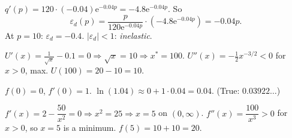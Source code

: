 \begin{solutions}
  \item $q'(p)=120\cdot(-0.04)\mathrm{e}^{-0.04p}
        =-4.8\mathrm{e}^{-0.04p}$. So
        \[
          \varepsilon_d(p)=\frac{p}{120\mathrm{e}^{-0.04p}}
            \cdot(-4.8\mathrm{e}^{-0.04p})=-0.04p .
        \]
        At $p=10$: $\varepsilon_d=-0.4$. $|\varepsilon_d|<1$:
        \emph{inelastic}.

  \item $U'(x)=\tfrac{1}{\sqrt{x}}-0.1=0\Rightarrow\sqrt{x}=10
        \Rightarrow x^*=100$. $U''(x)=-\tfrac{1}{2}x^{-3/2}<0$ for $x>0$,
        max. $U(100)=20-10=10$.

  \item $f(0)=0$, $f'(0)=1$. $\ln(1.04)\approx 0+1\cdot0.04=0.04$.
        (True: $0.03922\ldots$)

  \item $f'(x)=2-\dfrac{50}{x^2}=0\Rightarrow x^2=25\Rightarrow x=5$ on
        $(0,\infty)$. $f''(x)=\dfrac{100}{x^3}>0$ for $x>0$, so $x=5$ is
        a minimum. $f(5)=10+10=20$.
\end{solutions}
